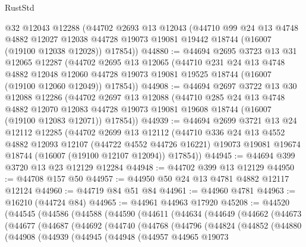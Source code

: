 \begin{lexlean}{RustStd}
\begin{coremodule}
    @32
    @12043
    @12288
    (@44702
      @2693
      @13
      @12043
      (@44710
        @99
        @24
        @13
        @4748
        @4882
        @12027
        @12038
        @44728
        @19073
        @19081
        @19442
        @18744
        (@16007 (@19100 @12038 @12028))
        @17854))
@44880 := @44694
    @2695
    @3723
    @13
    @31
    @12065
    @12287
    (@44702
      @2695
      @13
      @12065
      (@44710
        @231
        @24
        @13
        @4748
        @4882
        @12048
        @12060
        @44728
        @19073
        @19081
        @19525
        @18744
        (@16007 (@19100 @12060 @12049))
        @17854))
@44908 := @44694
    @2697
    @3722
    @13
    @30
    @12088
    @12286
    (@44702
      @2697
      @13
      @12088
      (@44710
        @285
        @24
        @13
        @4748
        @4882
        @12070
        @12083
        @44728
        @19073
        @19081
        @19608
        @18744
        (@16007 (@19100 @12083 @12071))
        @17854))
@44939 := @44694
    @2699
    @3721
    @13
    @24
    @12112
    @12285
    (@44702
      @2699
      @13
      @12112
      (@44710
        @336
        @24
        @13
        @4552
        @4882
        @12093
        @12107
        (@44722 @4552 @44726 @16221)
        @19073
        @19081
        @19674
        @18744
        (@16007 (@19100 @12107 @12094))
        @17854))
@44945 := @44694 @399 @3720 @13 @23 @12129 @12284
@44948 := @44702 @399 @13 @12129
@44950 := @44708 @157 @50
@44957 := @44950 @50 @24 @13 @4781 @4882 @12117 @12124
@44960 := @44719 @84 @51 @84
@44961 := @44960 @4781
@44963 := @16210 (@44724 @84)
@44965 := @44961 @44963 @17920
@45208 := @44520
    (@44545
      (@44586
        (@44588
          (@44590
            (@44611
              (@44634
                (@44649
                  (@44662
                    (@44673
                      (@44677
                        (@44687
                          (@44692
                            (@44740
                              (@44768
                                (@44796
                                  (@44824
                                    (@44852
                                      (@44880
                                        (@44908
                                          (@44939
                                            (@44945
                                              (@44948
                                                (@44957
                                                  @44965
                                                  @19073

\end{coremodule}
\end{lexlean}

